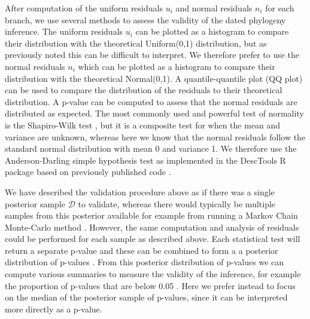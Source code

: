 \documentclass{article}
\begin{document}
After computation of the uniform residuals $u_i$ and normal residuals $n_i$ for each branch,
we use several methods to assess the validity of the dated phylogeny inference.
The uniform residuals $u_i$ can be plotted as a histogram to compare their
distribution with the theoretical Uniform(0,1) distribution, but as previously noted this can
be difficult to interpret. We therefore prefer to use the normal residuals $n_i$ which can be plotted
as a histogram to compare their distribution with the theoretical Normal(0,1).
A quantile-quantile plot (QQ plot) can be used to compare the distribution of the residuals
to their theoretical distribution.
A p-value can be computed to assess that the normal
residuals are distributed as expected. 
The most commonly used and powerful test of normality 
is the Shapiro-Wilk test \citep{razaliPowerComparisonsShapiroWilk2011},
but it is a composite test for when the mean and variance
are unknown, whereas here we know that the
normal residuals follow the standard normal distribution with
mean 0 and variance 1. We therefore use the
Anderson-Darling simple hypothesis 
test \citep{lewis1961distribution} 
as implemented in the DescTools R package
based on previously published code
\citep{marsagliaEvaluatingAndersonDarlingDistribution2004}. 

We have described the validation procedure above as if there was a single posterior
sample $\mathcal{D}$ to validate, whereas there would typically be multiple samples
from this posterior available for example from running a Markov Chain Monte-Carlo
method \citep{Didelot2018}. However, the same computation and analysis of residuals
could be performed for each sample as described above. Each statistical test will
return a separate p-value and these can be combined to form a 
a posterior distribution of p-values \citep{streftarisNonexponentialToleranceInfection2012,lauNewModelDiagnostics2014,gibsonComparisonAssessmentEpidemic2018}.
From this posterior distribution of p-values we can compute
various summaries to measure the validity of the inference,
for example the proportion of p-values that are below 0.05
\citep{lauNewModelDiagnostics2014}. Here we prefer instead
to focus on the median of the posterior sample of p-values,
since it can be interpreted more directly as a p-value.
\end{document}
